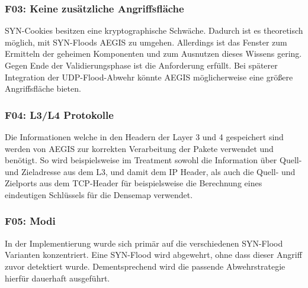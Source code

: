 \documentclass[../review_3.tex]{subfiles}
\begin{document}
\subsubsection{F03: Keine zusätzliche Angriffsfläche}
SYN-Cookies besitzen eine kryptographische Schwäche. Dadurch ist es theoretisch möglich, mit SYN-Floods AEGIS zu umgehen. Allerdings ist das Fenster zum Ermitteln der geheimen Komponenten und zum Ausnutzen dieses Wissens gering. Gegen Ende der Validierungsphase ist die Anforderung erfüllt. Bei späterer Integration der UDP-Flood-Abwehr könnte AEGIS möglicherweise eine größere Angriffsfläche bieten.


\subsubsection{F04: L3/L4 Protokolle}
Die Informationen welche in den Headern der Layer 3 und 4 gespeichert sind werden von AEGIS zur korrekten Verarbeitung der Pakete verwendet und benötigt. So wird beispielsweise im Treatment sowohl die Information über Quell- und Zieladresse aus dem L3, und damit dem IP Header, als auch die Quell- und Zielports aus dem TCP-Header für beispielsweise die Berechnung eines eindeutigen Schlüssels für die Densemap verwendet.

\subsubsection{F05: Modi}
In der Implementierung wurde sich primär auf die verschiedenen SYN-Flood Varianten konzentriert. Eine SYN-Flood wird abgewehrt, ohne dass dieser Angriff zuvor detektiert wurde. Dementsprechend wird die passende Abwehrstrategie hierfür dauerhaft ausgeführt.
\end{document}
